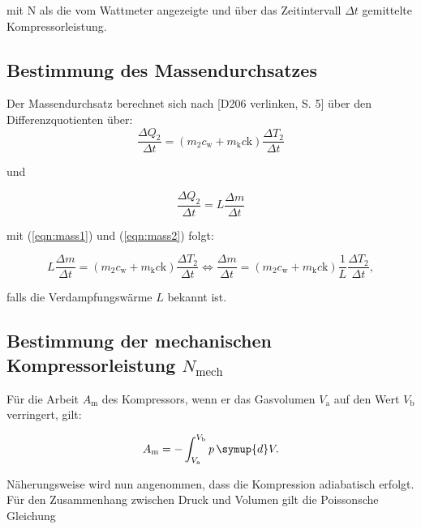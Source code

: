         mit N als die vom Wattmeter angezeigte und über das Zeitintervall $\Delta t$ gemittelte Kompressorleistung.


        \subsection{Bestimmung des Massendurchsatzes}

        Der Massendurchsatz berechnet sich nach [D206 verlinken, S. 5] über den Differenzquotienten über:
        \begin{equation}
            \frac{\Delta Q_2}{\Delta t} = \left( m_2  c_\text{w} + m_\text{k} c\text{k}\right) \frac{\Delta T_2}{\Delta t}
            \label{eqn:mass1}
        \end{equation}

        und 

        \begin{equation}
            \frac{\Delta Q_2}{\Delta t} = L \frac{\Delta m}{\Delta t}
            \label{eqn:mass2}
        \end{equation}

        mit (\ref{eqn:mass1}) und (\ref{eqn:mass2}) folgt:

        \begin{equation}
            L \frac{\Delta m}{\Delta t} = \left( m_2  c_\text{w} + m_\text{k} c\text{k}\right) \frac{\Delta T_2}{\Delta t} \iff \frac{\Delta m}{\Delta t} = \left( m_2  c_\text{w} + m_\text{k} c\text{k}\right) \frac{1}{L} \frac{\Delta T_2}{\Delta t},
        \end{equation}
        
        falls die Verdampfungswärme $L$ bekannt ist.


        \subsection{Bestimmung der mechanischen Kompressorleistung $N_\text{mech}$}

        Für die Arbeit $A_\text{m}$ des Kompressors, wenn er das Gasvolumen $V_\text{a}$ auf den Wert $V_\text{b}$ verringert, gilt:

        \begin{equation}
            A_\text{m} = - \int_{V_\text{a}}^{V_\text{b}} p \, \symup{d}V.
            \label{eqn:nmech1}
        \end{equation}

Näherungsweise wird nun angenommen, dass die Kompression adiabatisch erfolgt.
Für den Zusammenhang zwischen Druck und Volumen gilt die Poissonsche Gleichung

